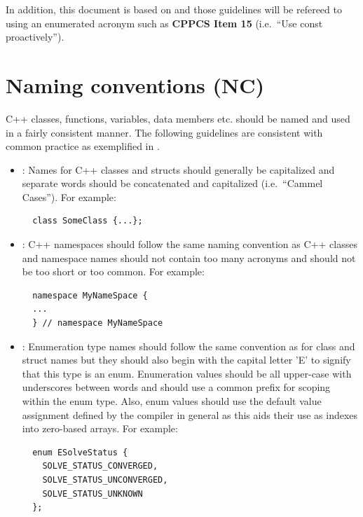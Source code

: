 In addition, this document is based on {}\cite{C++CodingStandards05}
and those guidelines will be refereed to using an enumerated acronym
such as {}\textbf{CPPCS Item 15} (i.e.\ ``Use const proactively'').

%
\section{Naming conventions (NC)}
\label{sec:NamingConventions}
%

C++ classes, functions, variables, data members etc. should be named and used
in a fairly consistent manner.  The following guidelines are consistent with
common practice as exemplified in {}\cite{EffectiveC++3rd05}.

\begin{itemize}

{}\item\NCClassNames: Names for C++ classes and structs should
generally be capitalized and separate words should be concatenated and
capitalized (i.e.\ ``Cammel Cases'').  For example:

{\small\begin{verbatim}
  class SomeClass {...};
\end{verbatim}}

{}\item\NCNamespaceNames: C++ namespaces should follow the same naming convention
as C++ classes and namespace names should not contain too many acronyms and
should not be too short or too common.  For example:

{\small\begin{verbatim}
  namespace MyNameSpace {
  ...
  } // namespace MyNameSpace 
\end{verbatim}}

{}\item\NCEnumNames: Enumeration type names should follow the same
convention as for class and struct names but they should also begin
with the capital letter 'E' to signify that this type is an enum.
Enumeration values should be all upper-case with underscores between
words and should use a common prefix for scoping within the enum type.
Also, enum values should use the default value assignment defined by
the compiler in general as this aids their use as indexes into
zero-based arrays.  For example:

{\small\begin{verbatim}
  enum ESolveStatus {
    SOLVE_STATUS_CONVERGED,
    SOLVE_STATUS_UNCONVERGED,
    SOLVE_STATUS_UNKNOWN
  };
\end{verbatim}}


\end{itemize}
